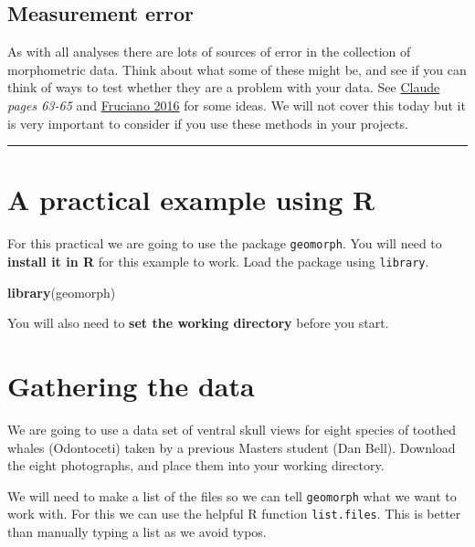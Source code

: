 \documentclass[]{book}
\newenvironment{Shaded}{\begin{snugshade}}{\end{snugshade}}
\newcommand{\KeywordTok}[1]{\textcolor[rgb]{0.13,0.29,0.53}{\textbf{{#1}}}}
\newcommand{\NormalTok}[1]{{#1}}
\theoremstyle{definition}
\theoremstyle{definition}
\theoremstyle{definition}
\theoremstyle{remark}
\begin{document}
\subsection{Measurement error}\label{measurement-error}

As with all analyses there are lots of sources of error in the
collection of morphometric data. Think about what some of these might
be, and see if you can think of ways to test whether they are a problem
with your data. See
\href{http://lib.du.ac.ir/documents/10157/60743/Morphometrics+With+R.pdf}{Claude}
\emph{pages 63-65} and
\href{http://link.springer.com/article/10.1007/s00427-016-0537-4}{Fruciano
2016} for some ideas. We will not cover this today but it is very
important to consider if you use these methods in your projects.

\begin{center}\rule{0.5\linewidth}{\linethickness}\end{center}

\section{A practical example using R}\label{a-practical-example-using-r}

For this practical we are going to use the package \texttt{geomorph}.
You will need to \textbf{install it in R} for this example to work. Load
the package using \texttt{library}.

\begin{Shaded}
\begin{Highlighting}[]
\KeywordTok{library}\NormalTok{(geomorph)}
\end{Highlighting}
\end{Shaded}

You will also need to \textbf{set the working directory} before you
start.

\section{Gathering the data}\label{gathering-the-data}

We are going to use a data set of ventral skull views for eight species
of toothed whales (Odontoceti) taken by a previous Masters student (Dan
Bell). Download the eight photographs, and place them into your working
directory.

We will need to make a list of the files so we can tell
\texttt{geomorph} what we want to work with. For this we can use the
helpful R function \texttt{list.files}. This is better than manually
typing a list as we avoid typos.
\end{document}
